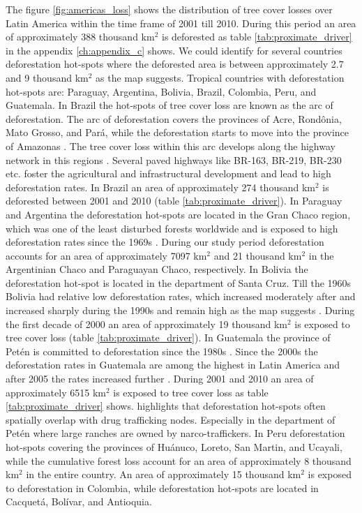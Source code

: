 			The figure \ref{fig:americas_loss} shows the distribution of tree cover losses over Latin America within the time frame of 2001 till 2010. During this period an area of approximately 388 thousand km$^2$ is deforested as table \ref{tab:proximate_driver} in the appendix \ref{ch:appendix_c} shows. We could identify for several countries deforestation hot-spots where the deforested area is between approximately 2.7 and 9 thousand km$^2$ as the map suggests. Tropical countries with deforestation hot-spots are: Paraguay, Argentina, Bolivia, Brazil, Colombia, Peru, and Guatemala. In Brazil the hot-spots of tree cover loss are known as the arc of deforestation. The arc of deforestation covers the provinces of Acre, Rond\^{o}nia, Mato Grosso, and Pará, while the deforestation starts to move into the province of Amazonas \citep{Wood2002}. The tree cover loss within this arc develops along the highway network in this regions \citep{Alves2002,Mueller2016}. Several paved highways like BR-163, BR-219, BR-230 etc. foster the agricultural and infrastructural development and lead to high deforestation rates. In Brazil an area of approximately 274 thousand km$^2$ is deforested between 2001 and 2010 (table \ref{tab:proximate_driver}). In Paraguay and Argentina the deforestation hot-spots are located in the Gran Chaco region, which was one of the least disturbed forests worldwide and is exposed to high deforestation rates since the 1969s \citep{Caldas2013,Zak2004}. During our study period deforestation accounts for an area of approximately 7097 km$^2$ and 21 thousand km$^2$ in the Argentinian Chaco and Paraguayan Chaco, respectively. In Bolivia the deforestation hot-spot is located in the department of Santa Cruz. Till the 1960s Bolivia had relative low deforestation rates, which increased moderately after and increased sharply during the 1990s and remain high as the map suggests \citep{Pacheco2002,DavidKaimowitz2002}. During the first decade of 2000 an area of approximately 19 thousand km$^2$ is exposed to tree cover loss (table \ref{tab:proximate_driver}). In Guatemala the province of Petén is committed to deforestation since the 1980s \citep{Beach1998}. Since the 2000s the deforestation rates in Guatemala are among the highest in Latin America and after 2005 the rates increased further \citep{McSweeney2014}. During 2001 and 2010 an area of approximately 6515 km$^2$ is exposed to tree cover loss as table \ref{tab:proximate_driver} shows. \citeauthor{McSweeney2014} highlights that deforestation hot-spots often spatially overlap with drug trafficking nodes. Especially in the department of Petén where large ranches are owned by narco-traffickers. In Peru deforestation hot-spots covering the provinces of Huánuco, Loreto, San Martin, and Ucayali, while the cumulative forest loss account for an area of approximately 8 thousand km$^2$ in the entire country. An area of approximately 15 thousand km$^2$ is exposed to deforestation in Colombia, while deforestation hot-spots are located in Cacquetá, Bolívar, and Antioquia.
